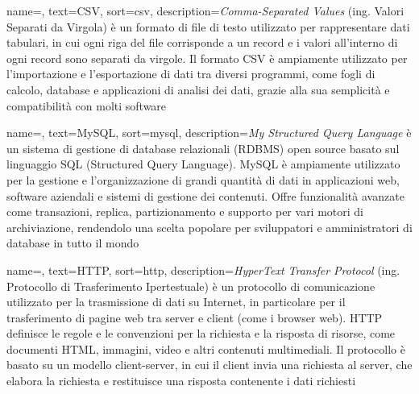  {
    name=,
    text=CSV,
    sort=csv,
    description={\emph{Comma-Separated Values} (ing. Valori Separati da Virgola) è un formato di file di testo utilizzato per rappresentare dati tabulari, in cui ogni riga del file corrisponde a un record e i valori all'interno di ogni record sono separati da virgole. Il formato CSV è ampiamente utilizzato per l'importazione e l'esportazione di dati tra diversi programmi, come fogli di calcolo, database e applicazioni di analisi dei dati, grazie alla sua semplicità e compatibilità con molti software}
}

 {
    name=,
    text=MySQL,
    sort=mysql,
    description={\emph{My Structured Query Language} è un sistema di gestione di database relazionali (RDBMS) open source basato sul linguaggio SQL (Structured Query Language). MySQL è ampiamente utilizzato per la gestione e l'organizzazione di grandi quantità di dati in applicazioni web, software aziendali e sistemi di gestione dei contenuti. Offre funzionalità avanzate come transazioni, replica, partizionamento e supporto per vari motori di archiviazione, rendendolo una scelta popolare per sviluppatori e amministratori di database in tutto il mondo}
}

 {
    name=,
    text=HTTP,
    sort=http,
    description={\emph{HyperText Transfer Protocol} (ing. Protocollo di Trasferimento Ipertestuale) è un protocollo di comunicazione utilizzato per la trasmissione di dati su Internet, in particolare per il trasferimento di pagine web tra server e client (come i browser web). HTTP definisce le regole e le convenzioni per la richiesta e la risposta di risorse, come documenti HTML, immagini, video e altri contenuti multimediali. Il protocollo è basato su un modello client-server, in cui il client invia una richiesta al server, che elabora la richiesta e restituisce una risposta contenente i dati richiesti}
}